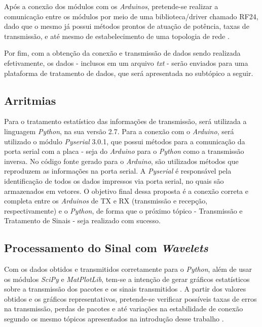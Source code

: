 \documentclass[conference]{IEEEtran}
\begin{document}
Ap\'os a conex\~ao dos m\'odulos com os \textit{Arduinos}, pretende-se realizar a comunica\c{c}\~ao entre os m\'odulos por meio de uma biblioteca/driver chamado RF24, dado que o mesmo j\'a possui m\'etodos prontos de atua\c{c}\~ao de pot\^encia, taxas de transmiss\~ao, e at\'e mesmo de estabelecimento de uma topologia de rede \cite{driverRF24}.

Por fim, com a obten\c{c}\~ao da conex\~ao e transmiss\~ao de dados sendo realizada efetivamente, os dados - inclusos em um arquivo \textit{txt} - ser\~ao enviados para uma plataforma de tratamento de dados, que ser\'a apresentada no subt\'opico a seguir.

\subsection{Arritmias}

Para o tratamento estat\'istico das informa\c{c}\~oes de transmiss\~ao, ser\'a utilizada a linguagem \textit{Python}, na sua vers\~ao 2.7. Para a conex\~ao com o \textit{Arduino}, ser\'a utilizado o m\'odulo \textit{Pyserial} 3.0.1, que possui m\'etodos para a comunica\c{c}\~ao da porta serial com a placa - seja do \textit{Arduino} para o \textit{Python} como a transmiss\~ao inversa. No c\'odigo fonte gerado para o \textit{Arduino}, s\~ao utilizados m\'etodos que reproduzem as informa\c{c}\~oes na porta serial. A \textit{Pyserial} \'e respons\'avel pela identifica\c{c}\~ao de todos os dados impressos via porta serial, no quais s\~ao armazenados em vetores. O objetivo final dessa proposta \'e a conex\~ao correta e completa entre os \textit{Arduinos} de TX e RX (transmiss\~ao e recep\c{c}\~ao, respectivamente) e o \textit{Python}, de forma que o pr\'oximo t\'opico - Transmiss\~ao e Tratamento de Sinais - seja realizado com sucesso.

\subsection{Processamento do Sinal com \textit{Wavelets}}
Com os dados obtidos e transmitidos corretamente para o \textit{Python}, al\'em de usar os m\'odulos \textit{SciPy} e \textit{MatPlotLib}, tem-se a inten\c{c}\~ao de gerar gr\'aficos estat\'isticos sobre a transmiss\~ao dos pacotes e os sinais transmitidos \cite{pythonPSV}. A partir dos valores obtidos e os gr\'aficos representativos, pretende-se verificar poss\'iveis taxas de erros na transmiss\~ao, perdas de pacotes e at\'e varia\c{c}\~oes na estabilidade de conex\~ao segundo os mesmo t\'opicos apresentados na introdu\c{c}\~ao desse trabalho \cite{ciscoRfProblems}.
\end{document}
